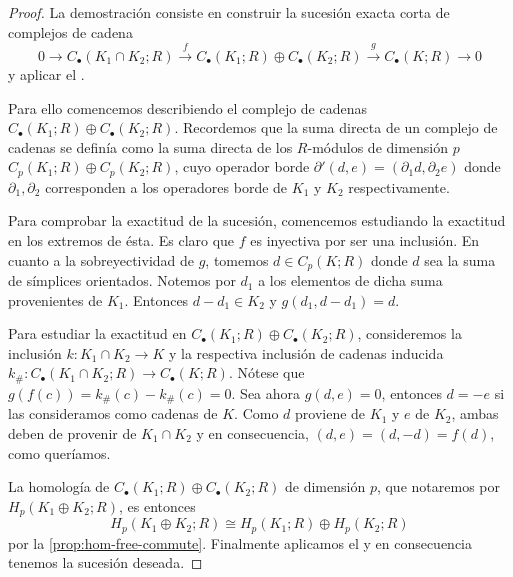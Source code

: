 \begin{proof}
	La demostración consiste en construir la sucesión exacta corta de complejos de
	cadena
	\[
	0 \to C_{\bullet}(K_{1}\cap K_{2};R) \overset{f}{\to}C_{\bullet}(K_{1};R) \oplus
	C_{\bullet}(K_{2};R) \overset{g}{\to}C_{\bullet}(K;R) \to 0
	\]
	y aplicar el .
	
	Para ello comencemos describiendo el complejo de cadenas
	\(C_{\bullet}(K_{1};R) \oplus C_{\bullet}(K_{2};R)\). Recordemos que la suma directa
	de un complejo de cadenas se definía como la suma directa de los \(R\)-módulos de
	dimensión \(p\) \(C_{p}(K_{1};R) \oplus C_{p}(K_{2};R)\), cuyo operador borde
	\(\partial'(d,e) = (\partial_{1}d, \partial_{2}e)\) donde
	\(\partial_{1}, \partial_{2}\) corresponden a los operadores borde de \(K_{1}\) y
	\(K_{2}\) respectivamente.
	
	Para comprobar la exactitud de la sucesión, comencemos estudiando la exactitud
	en los extremos de ésta. Es claro que \(f\) es inyectiva por ser una inclusión. En
	cuanto a la sobreyectividad de \(g\), tomemos \(d \in C_{p}(K;R)\) donde \(d\) sea
	la suma de símplices orientados. Notemos por \(d_{1}\) a los elementos de dicha suma
	provenientes de \(K_{1}\). Entonces \(d - d_{1}\in K_{2}\) y
	\(g(d_{1}, d-d_{1}) = d\).
	
	Para estudiar la exactitud en
	\(C_{\bullet}(K_{1};R) \oplus C_{\bullet}(K_{2};R)\), consideremos la inclusión \(k
	: K_{1}\cap K_{2}\to K\) y la respectiva inclusión de cadenas inducida \(k_{\#}:
	C_{\bullet}(K_{1}\cap K_{2};R) \to C_{\bullet}(K;R)\). Nótese que
	\(g(f(c)) = k_{\#}(c) - k_{\#}(c) = 0\). Sea ahora \(g(d,e) = 0\), entonces
	\(d = -e\) si las consideramos como cadenas de \(K\). Como \(d\) proviene de \(K_{1}\)
	y \(e\) de \(K_{2}\), ambas deben de provenir de \(K_{1}\cap K_{2}\) y en
	consecuencia, \((d,e) = (d,-d) = f(d)\), como queríamos.
	
	La homología de \(C_{\bullet}(K_{1};R) \oplus C_{\bullet}(K_{2};R)\) de
	dimensión \(p\), que notaremos por \(H_{p}(K_{1}\oplus K_{2};R)\), es entonces
	\[
	H_{p}(K_{1}\oplus K_{2};R) \cong H_{p}(K_{1};R) \oplus H_{p}(K_{2};R)
	\]
	por la \autoref{prop:hom-free-commute}. Finalmente aplicamos el 
	y en consecuencia tenemos la sucesión deseada.
	

\end{proof}
